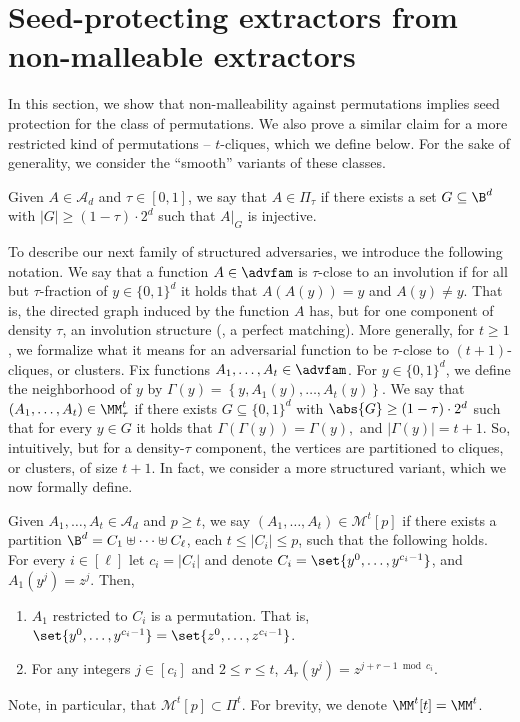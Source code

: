 \documentclass{toc}
\begin{document}
%
\section{Seed-protecting   %
extractors from non-malleable extractors}

In this section, we show that non-malleability against permutations
implies seed protection for the class of permutations. We also prove a similar claim for a more
restricted kind of permutations -- $t$-cliques, which we define below. For the sake of generality, we consider the ``smooth'' variants of these classes.

\begin{definition}\label{def:smooth2}
Given $A \in \mathcal{A}_d$ and $\tau \in [0,1]$, we say that $A \in \Pi_\tau$ if there exists a set $G \subseteq \B^d$ 
with $|G| \ge (1-\tau) \cdot 2^d$ such that $A|_G$ is injective.
\end{definition}

To describe our next family of structured adversaries, we introduce the following notation. We say that a function $A \in \advfam$ is $\tau$-close to an involution if for all but $\tau$-fraction of $y \in \{0,1\}^d$ it holds that $A(A(y)) = y$ and $A(y) \neq y$. That is, the directed graph induced by the function $A$ has, but for one component of density $\tau$, an involution structure (\ie, a perfect matching). More generally, for $t \ge 1$, we formalize what it means for an adversarial function to be $\tau$-close to  $(t+1)$-cliques, or clusters. Fix functions $A_1,\ldots,A_t \in \advfam$. For $y\in \{0,1\}^d$, we define the neighborhood of $y$ by
	$
	\Gamma(y) = \left\{y,A_1(y),\ldots, A_t(y)\right\}.
	$	
	We say that $(A_1,\ldots,A_t) \in \MM_\tau^t$ if there exists $G \subseteq \{0,1\}^d$ with $\abs{G} \geq (1-\tau)\cdot2^d$ such that for every $y \in G$ it holds that
	$
	\Gamma(\Gamma(y)) = \Gamma(y),
	$
	and $|\Gamma(y)| = t+1$. So, intuitively, but for a density-$\tau$ component, the vertices are partitioned to cliques, or clusters, of size $t+1$. In fact, we consider a more structured variant, which we now formally define.


\begin{definition}[$t$-cliques]\label{def:cliques}
Given $A_1,\ldots,A_t \in \mathcal{A}_d$ and $p \ge t$, we say
$\left(A_1,\ldots,A_t \right) \in \mathcal{M}^{t}[p]$ if there exists a
partition $\B^d = C_1 \uplus \cdots \uplus C_\ell$, each $t \le |C_i| \le p$, such that
the following holds. For every $i \in [\ell]$ let $c_i = |C_i|$ and denote $C_i = \set{y^{0},\ldots,y^{c_i-1}}$, and $A_{1}\left(y^{j}\right) = z^{j}$. Then,
\begin{enumerate}
    \item $A_1$ restricted to $C_i$ is a permutation. That is, $\set{y^{0},\ldots,y^{c_i-1}} = \set{z^{0},\ldots,z^{c_i-1}}$. 
    \item For any integers $j \in [c_i]$ and $2 \le r \le t$, $A_{r}\left( y^j \right) = z^{j+ r-1 \bmod c_i}$.
\end{enumerate}
Note, in particular, that $\mathcal{M}^t[p] \subset \Pi^t$. For brevity, we denote $\MM^t[t] = \MM^t$.
\end{definition}
\end{document}
